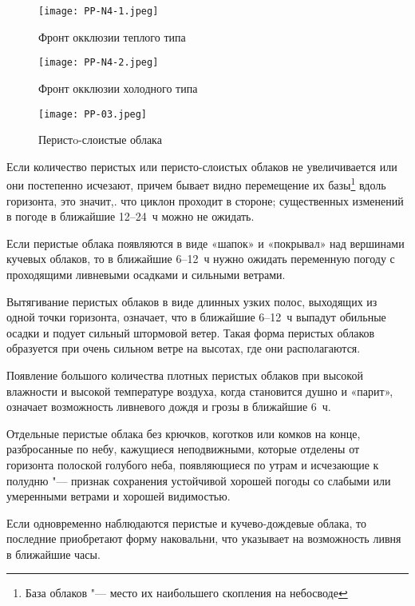 \begin{figure}[htb]
  \centering{}
  \texttt{[image: PP-N4-1.jpeg]}
  \caption{Фронт окклюзии теплого типа}
  \label{fig:pp-n4-1}
\end{figure}

\begin{figure}[htb]
  \centering{}
  \texttt{[image: PP-N4-2.jpeg]}
  \caption{Фронт окклюзии холодного типа}
  \label{fig:pp-n4-2}
\end{figure}

\begin{figure}[htb]
  \centering{}
  \texttt{[image: PP-03.jpeg]}
  \caption{Перистo-слоистые облака}
  \label{fig:pp03}
  \small
  \centering{}
\end{figure}

 Если количество перистых или перисто-слоистых облаков не
увеличивается или они постепенно исчезают, причем бывает видно
перемещение их базы\footnote{База облаков "--- место их наибольшего
  скопления на небосводе} вдоль горизонта, это значит,. что циклон
проходит в стороне; существенных изменений в погоде в ближайшие
12--24~ч можно не ожидать.

 Если перистые облака появляются в виде «шапок» и «покрывал» над
вершинами кучевых облаков, то в ближайшие 6--12~ч нужно ожидать
переменную погоду с проходящими ливневыми осадками и сильными ветрами.

 Вытягивание перистых облаков в виде длинных узких полос, выходящих
из одной точки горизонта, означает, что в ближайшие 6--12~ч выпадут
обильные осадки и подует сильный штормовой ветер. Такая форма перистых
облаков образуется при очень сильном ветре на высотах, где они
располагаются.

 Появление большого количества плотных перистых облаков при
высокой влажности и высокой температуре воздуха, когда становится
душно и «парит», означает возможность ливневого дождя и грозы в
ближайшие 6~ч.

 Отдельные перистые облака без крючков, коготков или комков на
конце, разбросанные по небу, кажущиеся неподвижными, которые отделены
от горизонта полоской голубого неба, появляющиеся по утрам и
исчезающие к полудню "--- признак сохранения устойчивой хорошей погоды
со слабыми или умеренными ветрами и хорошей видимостью.

 Если одновременно наблюдаются перистые и кучево-дождевые
облака, то последние приобретают форму наковальни, что указывает на
возможность ливня в ближайшие часы.

